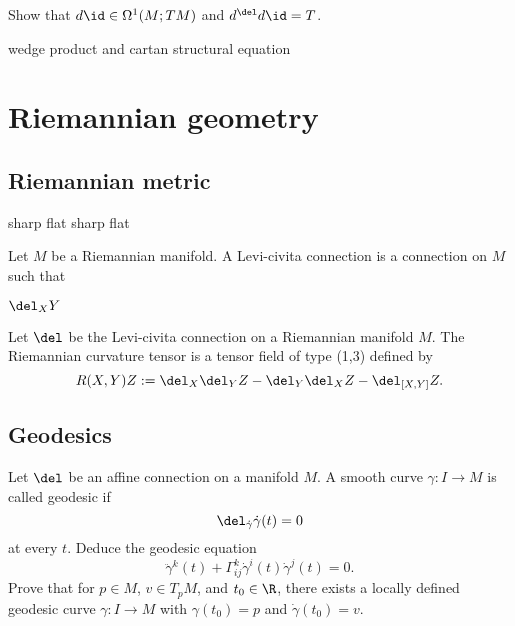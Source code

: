 \documentclass[11pt]{article}
\begin{document}
\begin{prb}
\mtprb
\end{prb}


\begin{prb}
\q Show that $d\id\in\Omega^1(M;TM)$ and $d^\del d\id=T$.
\end{prb}

\begin{prb}
wedge product and cartan structural equation
\end{prb}
















\section{Riemannian geometry}

\subsection{Riemannian metric}

\begin{prb}
sharp flat
\q sharp flat
\end{prb}


\begin{prb}
Let $M$ be a Riemannian manifold.
A Levi-civita connection is a connection on $M$ such that
\begin{cond}
\item $\del_XY$
\end{cond}
\end{prb}


\begin{prb}
Let $\del$ be the Levi-civita connection on a Riemannian manifold $M$.
The Riemannian curvature tensor is a tensor field of type (1,3) defined by
\[R(X,Y)Z:=\del_X\del_YZ-\del_Y\del_XZ-\del_{[X,Y]}Z.\]

\end{prb}


\subsection{Geodesics}
\begin{prb}
Let $\del$ be an affine connection on a manifold $M$.
A smooth curve $\gamma\colon I\to M$ is called geodesic if \[\del_{\dot\gamma}\dot\gamma(t)=0\] at every $t$.
\q Deduce the geodesic equation \[\ddot\gamma^k(t)+\Gamma_{ij}^k\dot\gamma^i(t)\dot\gamma^j(t)=0.\]
\q Prove that for $p\in M$, $v\in T_pM$, and $t_0\in\R$, there exists a locally defined geodesic curve $\gamma\colon I\to M$ with $\gamma(t_0)=p$ and $\dot\gamma(t_0)=v$.
\end{prb}
\end{document}
